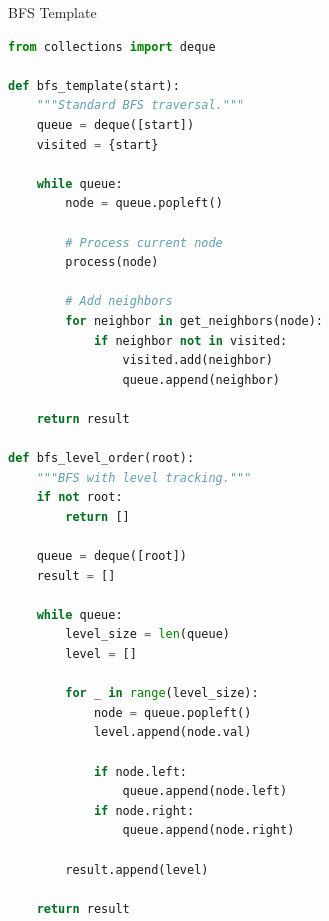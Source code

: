 \documentclass[aspectratio=169,xcolor=dvipsnames]{beamer}
\begin{document}
\begin{frame}[fragile]{BFS Template}
\begin{lstlisting}[language=Python, basicstyle=\tiny\ttfamily]
from collections import deque

def bfs_template(start):
    """Standard BFS traversal."""
    queue = deque([start])
    visited = {start}

    while queue:
        node = queue.popleft()

        # Process current node
        process(node)

        # Add neighbors
        for neighbor in get_neighbors(node):
            if neighbor not in visited:
                visited.add(neighbor)
                queue.append(neighbor)

    return result

def bfs_level_order(root):
    """BFS with level tracking."""
    if not root:
        return []

    queue = deque([root])
    result = []

    while queue:
        level_size = len(queue)
        level = []

        for _ in range(level_size):
            node = queue.popleft()
            level.append(node.val)

            if node.left:
                queue.append(node.left)
            if node.right:
                queue.append(node.right)

        result.append(level)

    return result
\end{lstlisting}
\end{frame}
\end{document}
